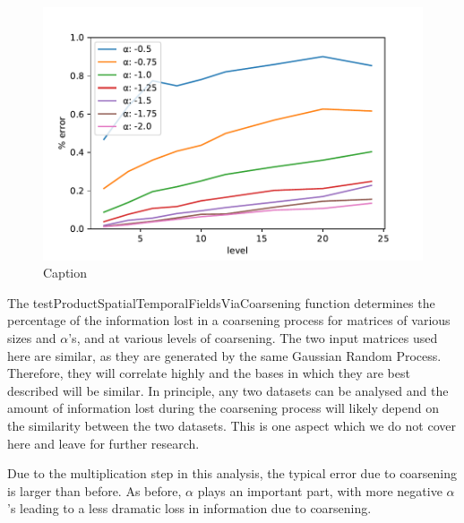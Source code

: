 \documentclass{acm_proc_article-sp}
\begin{document}
\begin{figure}[h]
\begin{center}
\includegraphics[scale=0.5]{Results/plotSingleSpatialFieldViaCoarsening.pdf}
\caption[Small caption]{Caption}
\label{fig:plotSingleSpatialFieldViaCoarsening}
\end{center}
\end{figure}

The testProductSpatialTemporalFieldsViaCoarsening function determines the percentage of the information lost in a coarsening process for matrices of various sizes and $\alpha$'s, and at various levels of coarsening. The two input matrices used here are similar, as they are generated by the same Gaussian Random Process. Therefore, they will correlate highly and the bases in which they are best described will be similar. In principle, any two datasets can be analysed and the amount of information lost during the coarsening process will likely depend on the similarity between the two datasets. This is one aspect which we do not cover here and leave for further research.

Due to the multiplication step in this analysis, the typical error due to coarsening is larger than before. As before, $\alpha$ plays an important part, with more negative $\alpha$'s leading to a less dramatic loss in information due to coarsening.
\end{document}
